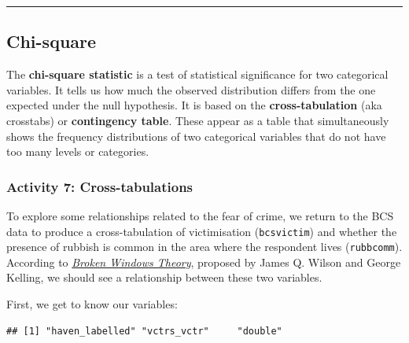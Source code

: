 \documentclass[
]{book}
\newenvironment{Shaded}{\begin{snugshade}}{\end{snugshade}}
\newcommand{\CommentTok}[1]{\textcolor[rgb]{0.56,0.35,0.01}{\textit{#1}}}
\newcommand{\FunctionTok}[1]{\textcolor[rgb]{0.00,0.00,0.00}{#1}}
\newcommand{\NormalTok}[1]{#1}
\newcommand{\SpecialCharTok}[1]{\textcolor[rgb]{0.00,0.00,0.00}{#1}}
\begin{document}
\begin{center}\rule{0.5\linewidth}{0.5pt}\end{center}

\hypertarget{chi-square}{%
\subsection{Chi-square}\label{chi-square}}

The \textbf{chi-square statistic} is a test of statistical significance for two categorical variables. It tells us how much the observed distribution differs from the one expected under the null hypothesis. It is based on the \textbf{cross-tabulation} (aka crosstabs) or \textbf{contingency table}. These appear as a table that simultaneously shows the frequency distributions of two categorical variables that do not have too many levels or categories.

\hypertarget{activity-7-cross-tabulations}{%
\subsubsection{Activity 7: Cross-tabulations}\label{activity-7-cross-tabulations}}

To explore some relationships related to the fear of crime, we return to the BCS data to produce a cross-tabulation of victimisation (\texttt{bcsvictim}) and whether the presence of rubbish is common in the area where the respondent lives (\texttt{rubbcomm}). According to \href{https://www.theatlantic.com/magazine/archive/1982/03/broken-windows/304465/}{\emph{Broken Windows Theory}}, proposed by James Q. Wilson and George Kelling, we should see a relationship between these two variables.

First, we get to know our variables:

\begin{Shaded}
\end{Shaded}

\begin{verbatim}
## [1] "haven_labelled" "vctrs_vctr"     "double"
\end{verbatim}

\begin{Shaded}
\end{Shaded}
\end{document}
